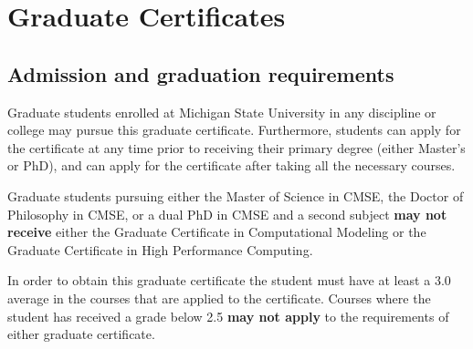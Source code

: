 \section{Graduate Certificates}
\label{sec:grad_certs}

\subsection{Admission and graduation requirements}

Graduate students enrolled at Michigan State University in any
discipline or college may pursue this graduate certificate.
Furthermore, students can apply for the certificate at any time prior
to receiving their primary degree (either Master’s or PhD), and can
apply for the certificate after taking all the necessary courses.

Graduate students pursuing either the Master of Science in CMSE, the
Doctor of Philosophy in CMSE, or a dual PhD in CMSE and a second
subject \textbf{may not  receive} either the Graduate Certificate in
Computational Modeling or the Graduate Certificate in High Performance
Computing.

In order to obtain this graduate certificate the student must have at
least a 3.0 average in the courses that are applied to the
certificate.  Courses where the student has received a grade below 2.5
\textbf{may not apply} to the requirements of either graduate
certificate.

\newpage



\newpage

